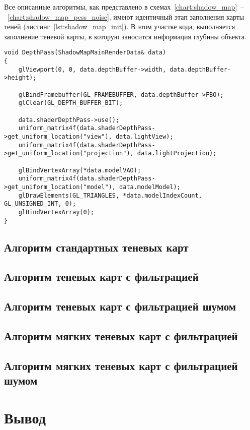 Все описанные алгоритмы, как представлено в
схемах~\ref{chart:shadow_map}~--~\ref{chart:shadow_map_pcss_noise},
имеют идентичный этап заполнения карты теней (листинг~\ref{lst:shadow_map_init}).
В этом участке кода, выполняется заполнение теневой карты, в которую заносится
информация глубины объекта.

\begin{center}
\captionsetup{justification=centering, singlelinecheck=off}
\begin{lstlisting}[label=lst:shadow_map_init, caption=Алгоритм заполнения теневой карты]
void DepthPass(ShadowMapMainRenderData& data)
{
    glViewport(0, 0, data.depthBuffer->width, data.depthBuffer->height);

    glBindFramebuffer(GL_FRAMEBUFFER, data.depthBuffer->FBO);
    glClear(GL_DEPTH_BUFFER_BIT);

    data.shaderDepthPass->use();
    uniform_matrix4f(data.shaderDepthPass->get_uniform_location("view"), data.lightView);
    uniform_matrix4f(data.shaderDepthPass->get_uniform_location("projection"), data.lightProjection);

    glBindVertexArray(*data.modelVAO);
    uniform_matrix4f(data.shaderDepthPass->get_uniform_location("model"), data.modelModel);
    glDrawElements(GL_TRIANGLES, *data.modelIndexCount, GL_UNSIGNED_INT, 0);
    glBindVertexArray(0);
}
\end{lstlisting}
\end{center}

\subsection{Алгоритм стандартных теневых карт}

\subsection{Алгоритм теневых карт с фильтрацией}

\subsection{Алгоритм теневых карт с фильтрацией шумом}

\subsection{Алгоритм мягких теневых карт с фильтрацией}

\subsection{Алгоритм мягких теневых карт с фильтрацией шумом}

\section*{Вывод}